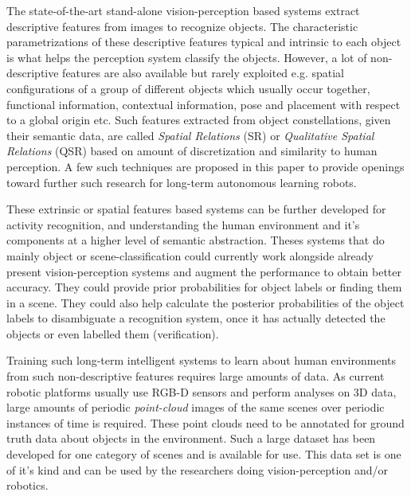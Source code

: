 \documentclass[letterpaper, 10 pt, conference]{ieeeconf}  %
\begin{document}
The state-of-the-art stand-alone vision-perception based systems extract descriptive features from images to recognize objects. The characteristic parametrizations of these descriptive features typical and intrinsic to each object is what helps the perception system classify the objects. However, a lot of non-descriptive features are also available but rarely exploited e.g. spatial configurations of a group of different objects which usually occur together, functional information, contextual information, pose and placement with respect to a global origin etc. Such features extracted from object constellations, given their semantic data, are called \textit{Spatial Relations} (SR) or \textit{Qualitative Spatial Relations} (QSR) based on amount of discretization and similarity to human perception. A few such techniques are proposed in this paper to provide openings toward further such research for long-term autonomous learning robots.

These extrinsic or spatial features based systems can be further developed for activity recognition, and understanding the human environment and it's components at a higher level of semantic abstraction. Theses systems that do mainly object or scene-classification could currently work alongside already present vision-perception systems and augment the performance to obtain better accuracy. They could provide prior probabilities for object labels or finding them in a scene. They could also help calculate the posterior probabilities of the object labels to disambiguate a recognition system, once it has actually detected the objects or even labelled them (verification).

Training such long-term intelligent systems to learn about human environments from such non-descriptive features requires large amounts of data. As current robotic platforms usually use RGB-D sensors and perform analyses on 3D data, large amounts of periodic \textit{point-cloud} images of the same scenes over periodic instances of time is required. These point clouds need to be annotated for ground truth data about objects in the environment. Such a large dataset has been developed for one category of scenes and is available for use. This data set is one of it's kind and can be used by the researchers doing vision-perception and/or robotics.
\end{document}
